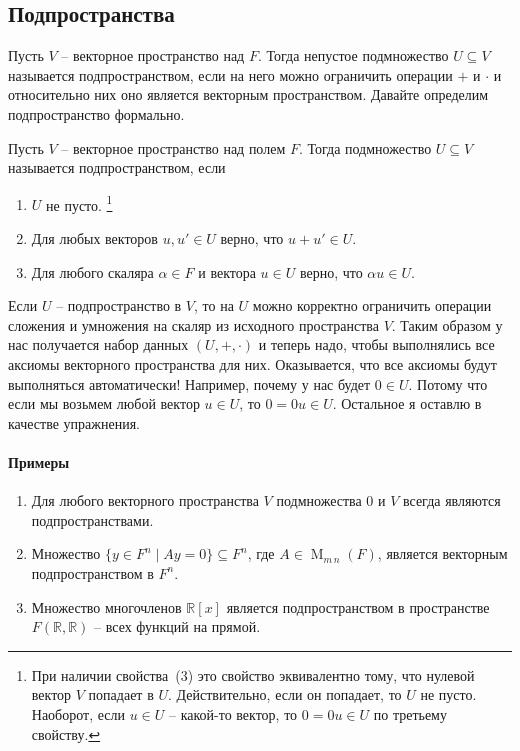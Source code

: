 \subsection{Подпространства}

Пусть $V$ -- векторное пространство над $F$.
Тогда непустое подмножество $U\subseteq V$ называется подпространством, если на него можно ограничить операции $+$ и $\cdot$ и относительно них оно является векторным пространством.
Давайте определим подпространство формально.
\begin{definition}
\label{def::Subspace}
Пусть $V$ -- векторное пространство над полем $F$.
Тогда подмножество $U\subseteq V$ называется подпространством, если
\begin{enumerate}
\item $U$ не пусто.%
\footnote{При наличии свойства~(3) это свойство эквивалентно тому, что нулевой вектор $V$ попадает в $U$.
Действительно, если он попадает, то $U$ не пусто.
Наоборот, если $u\in U$ -- какой-то вектор, то $0 = 0 u\in U$ по третьему свойству.}

\item Для любых векторов $u,u'\in U$ верно, что $u+u'\in U$.

\item Для любого скаляра $\alpha\in F$ и вектора $u\in U$ верно, что $\alpha u \in U$.
\end{enumerate}
\end{definition}
Если $U$ -- подпространство в $V$, то на $U$ можно корректно ограничить операции сложения и умножения на скаляр из исходного пространства $V$.
Таким образом у нас получается набор данных $(U, +, \cdot)$ и теперь надо, чтобы выполнялись все аксиомы векторного пространства для них.
Оказывается, что все аксиомы будут выполняться автоматически!
Например, почему у нас будет $0\in U$.
Потому что если мы возьмем любой вектор $u\in U$, то $0 = 0 u \in U$.
Остальное я оставлю в качестве упражнения.

\paragraph{Примеры}

\begin{enumerate}
\item Для любого векторного пространства $V$ подмножества $0$ и $V$ всегда являются подпространствами.

\item Множество $\{y\in F^n \mid Ay = 0\}\subseteq F^n$, где $A\in\operatorname{M}_{m\,n}(F)$, является векторным подпространством в $F^n$.

\item Множество многочленов $\mathbb R[x]$ является подпространством в пространстве $F(\mathbb R, \mathbb R)$ -- всех функций на прямой.
\end{enumerate}

